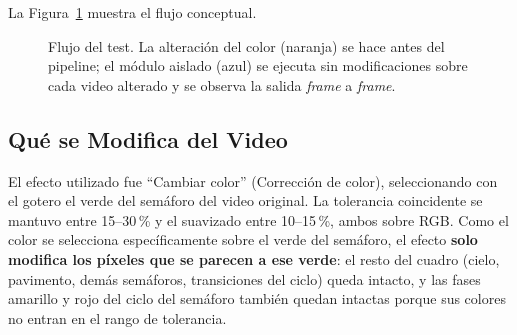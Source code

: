 La Figura~\ref{fig:flujo_test} muestra el flujo conceptual.

\begin{figure}[H]
\centering
{}
\caption[Flujo del test (perturbación \textit{pre-pipeline}).]{Flujo del test. La alteración del color (naranja) se hace antes del pipeline; el módulo aislado (azul) se ejecuta sin modificaciones sobre cada video alterado y se observa la salida \textit{frame} a \textit{frame}.}
\label{fig:flujo_test}
\end{figure}

\subsection{Qué se Modifica del Video}

El efecto utilizado fue ``Cambiar color'' (Corrección de color), seleccionando con el gotero el verde del semáforo del video original. La tolerancia coincidente se mantuvo entre 15--30\,\% y el suavizado entre 10--15\,\%, ambos sobre RGB. Como el color se selecciona específicamente sobre el verde del semáforo, el efecto \textbf{solo modifica los píxeles que se parecen a ese verde}: el resto del cuadro (cielo, pavimento, demás semáforos, transiciones del ciclo) queda intacto, y las fases amarillo y rojo del ciclo del semáforo también quedan intactas porque sus colores no entran en el rango de tolerancia.

